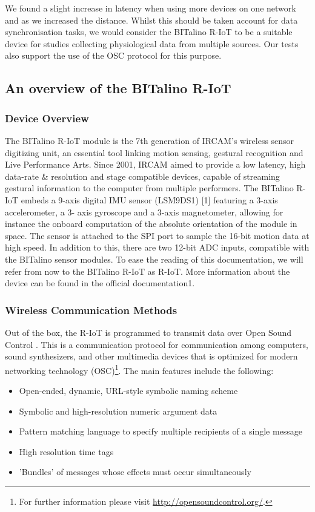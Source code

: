 We found a slight increase in latency when using more devices on one network and as we increased the distance. Whilst this should be taken account for data synchronisation tasks, we would consider the BITalino R-IoT to be a suitable device for studies collecting physiological data from multiple sources. Our tests also support the use of the OSC protocol for this purpose.

\subsection{An overview of the BITalino R-IoT}

\subsubsection{Device Overview}

The BITalino R-IoT module is the 7th generation of IRCAM's wireless sensor digitizing unit, an essential tool linking motion sensing, gestural recognition and Live Performance Arts. Since 2001, IRCAM aimed to provide a low latency, high data-rate & resolution and stage compatible devices, capable of streaming gestural information to the computer from multiple performers.
The BITalino R-IoT embeds a 9-axis digital IMU sensor (LSM9DS1) [1] featuring a 3-axis accelerometer, a 3- axis gyroscope and a 3-axis magnetometer, allowing for instance the onboard computation of the absolute orientation of the module in space. The sensor is attached to the SPI port to sample the 16-bit motion data at high speed. In addition to this, there are two 12-bit ADC inputs, compatible with the BITalino sensor modules. To ease the reading of this documentation, we will refer from now to the BITalino R-IoT as R-IoT. More information about the device can be found in the official documentation1.

\subsubsection{Wireless Communication Methods}
Out of the box, the R-IoT is programmed to transmit data over Open Sound Control . This is a communication protocol for communication among computers, sound synthesizers, and other multimedia devices that is optimized for modern networking technology (OSC)\footnote{For further information please visit \url{http://opensoundcontrol.org/}.}. The main features include the following:
\begin{itemize}
  \item Open-ended, dynamic, URL-style symbolic naming scheme
  \item Symbolic and high-resolution numeric argument data
  \item Pattern matching language to specify multiple recipients of a single message
  \item High resolution time tags
  \item 'Bundles' of messages whose effects must occur simultaneously
\end{itemize}

